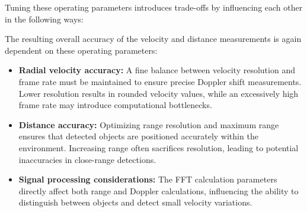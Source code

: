 Tuning these operating parameters introduces trade-offs by influencing each other in the following ways:
\begin{table}[h]
    \centering
    \caption{Radar System Tuning Parameters and Trade-offs}
    \label{tab:mmWave_Sensor_Parameters}
\end{table}
The resulting overall accuracy of the velocity and distance measurements is again dependent on these operating parameters:
\begin{itemize}
\item \textbf{Radial velocity accuracy:} A fine balance between velocity resolution and frame rate must be maintained to ensure precise Doppler shift measurements. Lower resolution results in rounded velocity values, while an excessively high frame rate may introduce computational bottlenecks.
\item \textbf{Distance accuracy:} Optimizing range resolution and maximum range ensures that detected objects are positioned accurately within the environment. Increasing range often sacrifices resolution, leading to potential inaccuracies in close-range detections.
\item \textbf{Signal processing considerations:} The FFT calculation parameters directly affect both range and Doppler calculations, influencing the ability to distinguish between objects and detect small velocity variations.
\end{itemize}

